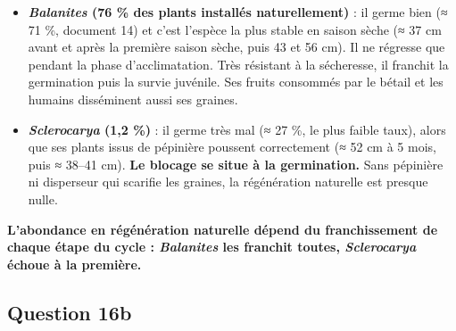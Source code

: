 \documentclass[11pt,a4paper]{article}
\providecommand{\tightlist}{\setlength{\itemsep}{0pt}\setlength{\parskip}{0pt}}
\begin{document}
\begin{itemize}
\tightlist
\item
  \textbf{\emph{Balanites} (76 \% des plants installés naturellement)} : il germe bien (≈ 71 \%, document 14) et c'est l'espèce la plus stable en saison sèche (≈ 37 cm avant et après la première saison sèche, puis 43 et 56 cm). Il ne régresse que pendant la phase d'acclimatation. Très résistant à la sécheresse, il franchit la germination puis la survie juvénile. Ses fruits consommés par le bétail et les humains disséminent aussi ses graines.
\item
  \textbf{\emph{Sclerocarya} (1,2 \%)} : il germe très mal (≈ 27 \%, le plus faible taux), alors que ses plants issus de pépinière poussent correctement (≈ 52 cm à 5 mois, puis ≈ 38--41 cm). \textbf{Le blocage se situe à la germination.} Sans pépinière ni disperseur qui scarifie les graines, la régénération naturelle est presque nulle.
\end{itemize}

\textbf{L'abondance en régénération naturelle dépend du franchissement de chaque étape du cycle : \emph{Balanites} les franchit toutes, \emph{Sclerocarya} échoue à la première.}

\hypertarget{question-16b}{%
\subsection{Question 16b}\label{question-16b}}
\end{document}
